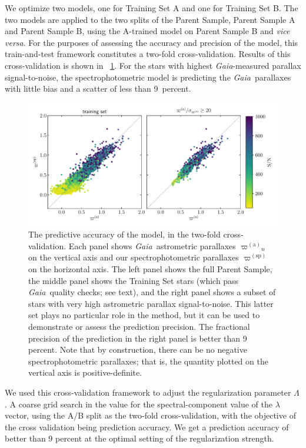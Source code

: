 \documentclass[modern]{aastex62}
\newcommand{\foreign}[1]{\textsl{#1}}
\newcommand{\project}[1]{\textsl{#1}}
\newcommand{\gaia}{\project{Gaia}}
\newcommand{\gparallax}{{\varpi^{(\mathrm{a})}}}
\newcommand{\sparallax}{{\varpi^{(\mathrm{sp})}}}
\begin{document}
We optimize two models, one for Training Set A and one for Training Set B.
The two models are applied to the two splits of the Parent Sample, Parent Sample
A and Parent Sample B, using the A-trained model on Parent Sample B and
\foreign{vice versa}.
For the purposes of assessing the accuracy and precision of the model, this
train-and-test framework constitutes a two-fold cross-validation.
Results of this cross-validation is shown in \figurename~\ref{fig:xval}.
For the stars with highest \gaia-measured parallax signal-to-noise,
the spectrophotometric model is predicting the \gaia\ parallaxes with little bias
and a scatter of less than 9~percent.
\begin{figure}
\includegraphics[width=\textwidth]{residuals.pdf}
\caption{The predictive accuracy of the model, in the two-fold cross-validation.
  Each panel shows \gaia\ astrometric parallaxes $\gparallax_n$ on the vertical axis
  and our spectrophotometric parallaxes $\sparallax$ on the horizontal axis.
  The left panel shows the full Parent Sample, the middle panel shows the Training Set
  stars (which pass \gaia\ quality checks; see text), and the right panel shows a
  subset of stars with very high astrometric parallax signal-to-noise. This latter
  set plays no particular role in the method, but it can be used to demonstrate or
  assess the prediction precision. The fractional precision of the prediction in the
  right panel is better than 9 percent. Note that by construction, there can be no negative
  spectrophotometric parallaxes; that is, the quantity plotted on the vertical axis is
  positive-definite.\label{fig:xval}}
\end{figure}

We used this cross-validation framework to adjust the regularization parameter $\Lambda$.
A coarse grid search in the value for the spectral-component value of the
$\lambda$ vector, using the A/B split as the two-fold cross-validation, with the objective
of the cross validation being prediction accuracy.
We get a prediction accuracy of better than 9 percent 
at the optimal setting of the regularization strength.
\end{document}
